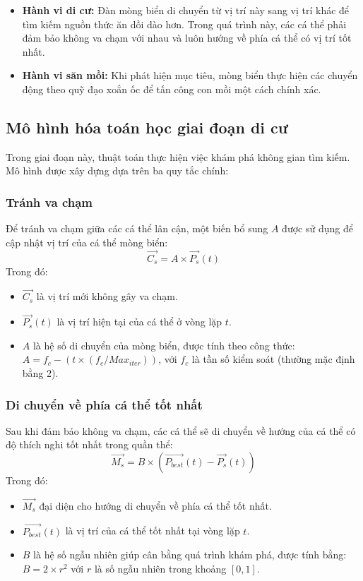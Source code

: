 \documentclass[12pt, a4paper]{article}
\begin{document}
\begin{itemize}
    \item \textbf{Hành vi di cư:} Đàn mòng biển di chuyển từ vị trí này sang vị trí khác để tìm kiếm nguồn thức ăn dồi dào hơn. Trong quá trình này, các cá thể phải đảm bảo không va chạm với nhau và luôn hướng về phía cá thể có vị trí tốt nhất.
    \item \textbf{Hành vi săn mồi:} Khi phát hiện mục tiêu, mòng biển thực hiện các chuyển động theo quỹ đạo xoắn ốc để tấn công con mồi một cách chính xác. 
\end{itemize}

\subsection{Mô hình hóa toán học giai đoạn di cư}
Trong giai đoạn này, thuật toán thực hiện việc khám phá không gian tìm kiếm. Mô hình được xây dựng dựa trên ba quy tắc chính:

\subsubsection{Tránh va chạm}
Để tránh va chạm giữa các cá thể lân cận, một biến bổ sung $A$ được sử dụng để cập nhật vị trí của cá thể mòng biển:
\begin{equation}
    \vec{C_s} = A \times \vec{P_s}(t)
\end{equation}
Trong đó:
\begin{itemize}
    \item $\vec{C_s}$ là vị trí mới không gây va chạm.
    \item $\vec{P_s}(t)$ là vị trí hiện tại của cá thể ở vòng lặp $t$.
    \item $A$ là hệ số di chuyển của mòng biển, được tính theo công thức: $A = f_c - (t \times (f_c / Max_{iter}))$, với $f_c$ là tần số kiểm soát (thường mặc định bằng 2).
\end{itemize}

\subsubsection{Di chuyển về phía cá thể tốt nhất}
Sau khi đảm bảo không va chạm, các cá thể sẽ di chuyển về hướng của cá thể có độ thích nghi tốt nhất trong quần thể:
\begin{equation}
    \vec{M_s} = B \times (\vec{P_{best}}(t) - \vec{P_s}(t))
\end{equation}
Trong đó:
\begin{itemize}
    \item $\vec{M_s}$ đại diện cho hướng di chuyển về phía cá thể tốt nhất.
    \item $\vec{P_{best}}(t)$ là vị trí của cá thể tốt nhất tại vòng lặp $t$.
    \item $B$ là hệ số ngẫu nhiên giúp cân bằng quá trình khám phá, được tính bằng: $B = 2 \times r^2$ với $r$ là số ngẫu nhiên trong khoảng $[0, 1]$.
\end{itemize}
\end{document}
